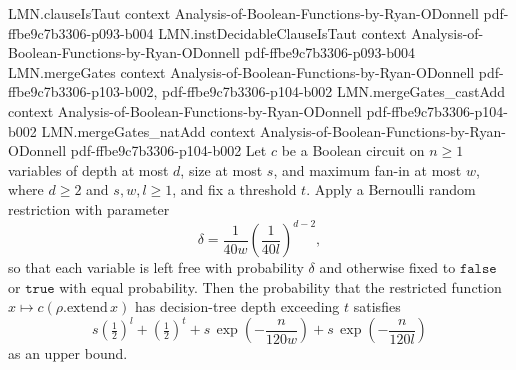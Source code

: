 \begin{lemma}
  {LMN.clauseIsTaut}
  {context}
  {Analysis-of-Boolean-Functions-by-Ryan-ODonnell}
  {pdf-ffbe9c7b3306-p093-b004}
\proofstep
  {LMN.instDecidableClauseIsTaut}
  {context}
  {Analysis-of-Boolean-Functions-by-Ryan-ODonnell}
  {pdf-ffbe9c7b3306-p093-b004}
\proofstep
  {LMN.mergeGates}
  {context}
  {Analysis-of-Boolean-Functions-by-Ryan-ODonnell}
  {pdf-ffbe9c7b3306-p103-b002,
    pdf-ffbe9c7b3306-p104-b002}
\proofstep
  {LMN.mergeGates_castAdd}
  {context}
  {Analysis-of-Boolean-Functions-by-Ryan-ODonnell}
  {pdf-ffbe9c7b3306-p104-b002}
\proofstep
  {LMN.mergeGates_natAdd}
  {context}
  {Analysis-of-Boolean-Functions-by-Ryan-ODonnell}
  {pdf-ffbe9c7b3306-p104-b002}
Let $c$ be a Boolean circuit on $n \ge 1$ variables of depth at most $d$, size at most
$s$, and maximum fan-in at most $w$, where $d \ge 2$ and $s, w, l \ge 1$, and fix a
threshold $t$. Apply a Bernoulli random restriction with parameter
\[
  \delta = \frac{1}{40w}\left(\frac{1}{40l}\right)^{d-2},
\]
so that each variable is left free with probability $\delta$ and otherwise fixed to
$\mathtt{false}$ or $\mathtt{true}$ with equal probability. Then the probability that
the restricted function $x \mapsto c(\rho.\mathrm{extend}\,x)$ has decision-tree depth
exceeding $t$ satisfies
\[
  s\left(\tfrac12\right)^{l} + \left(\tfrac12\right)^{t}
  + s\,\exp\!\left(-\frac{n}{120w}\right)
  + s\,\exp\!\left(-\frac{n}{120l}\right)
\]
as an upper bound.
\end{lemma}

